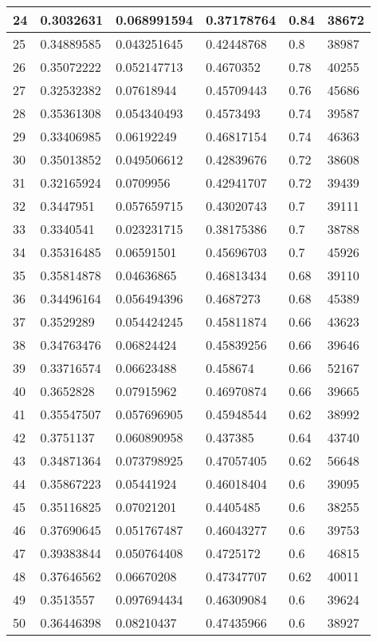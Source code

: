 \begin{longtable}{|l|l|l|l|l|l|}
24 & 0.3032631 & 0.068991594 & 0.37178764 & 0.84 & 38672 \\ \hline 
25 & 0.34889585 & 0.043251645 & 0.42448768 & 0.8 & 38987 \\ \hline 
26 & 0.35072222 & 0.052147713 & 0.4670352 & 0.78 & 40255 \\ \hline 
27 & 0.32532382 & 0.07618944 & 0.45709443 & 0.76 & 45686 \\ \hline 
28 & 0.35361308 & 0.054340493 & 0.4573493 & 0.74 & 39587 \\ \hline 
29 & 0.33406985 & 0.06192249 & 0.46817154 & 0.74 & 46363 \\ \hline 
30 & 0.35013852 & 0.049506612 & 0.42839676 & 0.72 & 38608 \\ \hline 
31 & 0.32165924 & 0.0709956 & 0.42941707 & 0.72 & 39439 \\ \hline 
32 & 0.3447951 & 0.057659715 & 0.43020743 & 0.7 & 39111 \\ \hline 
33 & 0.3340541 & 0.023231715 & 0.38175386 & 0.7 & 38788 \\ \hline 
34 & 0.35316485 & 0.06591501 & 0.45696703 & 0.7 & 45926 \\ \hline 
35 & 0.35814878 & 0.04636865 & 0.46813434 & 0.68 & 39110 \\ \hline 
36 & 0.34496164 & 0.056494396 & 0.4687273 & 0.68 & 45389 \\ \hline 
37 & 0.3529289 & 0.054424245 & 0.45811874 & 0.66 & 43623 \\ \hline 
38 & 0.34763476 & 0.06824424 & 0.45839256 & 0.66 & 39646 \\ \hline 
39 & 0.33716574 & 0.06623488 & 0.458674 & 0.66 & 52167 \\ \hline 
40 & 0.3652828 & 0.07915962 & 0.46970874 & 0.66 & 39665 \\ \hline 
41 & 0.35547507 & 0.057696905 & 0.45948544 & 0.62 & 38992 \\ \hline 
42 & 0.3751137 & 0.060890958 & 0.437385 & 0.64 & 43740 \\ \hline 
43 & 0.34871364 & 0.073798925 & 0.47057405 & 0.62 & 56648 \\ \hline 
44 & 0.35867223 & 0.05441924 & 0.46018404 & 0.6 & 39095 \\ \hline 
45 & 0.35116825 & 0.07021201 & 0.4405485 & 0.6 & 38255 \\ \hline 
46 & 0.37690645 & 0.051767487 & 0.46043277 & 0.6 & 39753 \\ \hline 
47 & 0.39383844 & 0.050764408 & 0.4725172 & 0.6 & 46815 \\ \hline 
48 & 0.37646562 & 0.06670208 & 0.47347707 & 0.62 & 40011 \\ \hline 
49 & 0.3513557 & 0.097694434 & 0.46309084 & 0.6 & 39624 \\ \hline 
50 & 0.36446398 & 0.08210437 & 0.47435966 & 0.6 & 38927 \\ \hline 
\end{longtable}